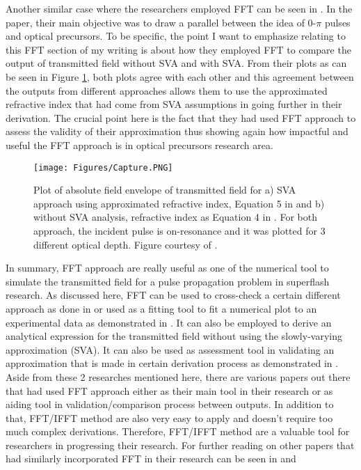 Another similar case where the researchers employed FFT can be seen in . In the paper, their main objective was to draw a parallel between the idea of 0-$\pi$ pulses and optical precursors. To be specific, the point I want to emphasize relating to this FFT section of my writing is about how they employed FFT to compare the output of transmitted field without SVA and with SVA. From their plots as can be seen in Figure \ref{fig: svafft}, both plots agree with each other and this agreement between the outputs from different approaches allows them to use the approximated refractive index that had come from SVA assumptions in going further in their derivation. The crucial point here is the fact that they had used FFT approach to assess the validity of their approximation thus showing again how impactful and useful the FFT approach is in optical precursors research area.

\begin{figure}
    \centering
    \texttt{[image: Figures/Capture.PNG]}
    \caption[Plot of Transmitted Field With and Without SVA]{Plot of absolute field envelope of transmitted field for a) SVA approach using approximated refractive index, Equation 5 in \protect{} and b) without SVA analysis, refractive index as Equation 4 in \protect{}. For both approach, the incident pulse is on-resonance and it was plotted for 3 different optical depth. Figure courtesy of \protect{}.}
    \label{fig: svafft}
\end{figure}

In summary, FFT approach are really useful as one of the numerical tool to simulate the transmitted field for a pulse propagation problem in superflash research. As discussed here, FFT can be used to cross-check a certain different approach as done in  or used as a fitting tool to fit a numerical plot to an experimental data as demonstrated in . It can also be employed to derive an analytical expression for the transmitted field without using the slowly-varying approximation (SVA). It can also be used as assessment tool in validating an approximation that is made in certain derivation process as demonstrated in . Aside from these 2 researches mentioned here, there are various papers out there that had used FFT approach either as their main tool in their research or as aiding tool in validation/comparison process between outputs. In addition to that, FFT/IFFT method are also very easy to apply and doesn't require too much complex derivations. Therefore, FFT/IFFT method are a valuable tool for researchers in progressing their research. For further reading on other papers that had similarly incorporated FFT in their research can be seen in  and 
